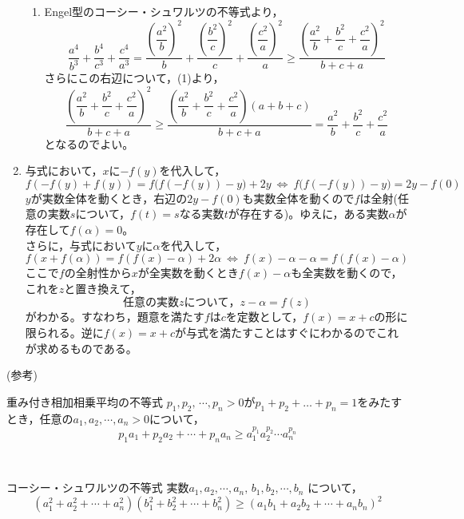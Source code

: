 \documentclass[a4paper,12pt]{jsarticle}
\begin{document}
\begin{enumerate}
\begin{enumerate}
  \item 
  Engel型のコーシー・シュワルツの不等式より，
    $$ \frac{a^{4}}{b^{3}} + \frac{b^{4}}{c^{3}} + \frac{c^{4}}{a^{3}} = \frac{\left(\dfrac{a^{2}}{b}\right)^{2}}{b} + \frac{\left(\dfrac{b^{2}}{c}\right)^{2}}{c} + \frac{\left(\dfrac{c^{2}}{a}\right)^{2}}{a} \geq \frac{\left(\dfrac{a^{2}}{b} + \dfrac{b^{2}}{c} + \dfrac{c^{2}}{a}\right)^{2}}{b+c+a} $$
  さらにこの右辺について，(1)より，
    $$ \frac{\left(\dfrac{a^{2}}{b} + \dfrac{b^{2}}{c} + \dfrac{c^{2}}{a}\right)^{2}}{b+c+a} \geq \frac{\left(\dfrac{a^{2}}{b} + \dfrac{b^{2}}{c} + \dfrac{c^{2}}{a}\right)(a+b+c)}{b+c+a} = \dfrac{a^{2}}{b} + \dfrac{b^{2}}{c} + \dfrac{c^{2}}{a} $$
  となるのでよい。
  \end{enumerate}

\item 
与式において，$x$に$-f(y)$を代入して，
$$ f(-f(y)+f(y)) = f\bigl(f(-f(y))-y\bigr) + 2y \ \Leftrightarrow \ f\bigl(f(-f(y))-y\bigr) = 2y - f(0)$$
$y$が実数全体を動くとき，右辺の$2y-f(0)$も実数全体を動くので$f$は全射(任意の実数$s$について，$f(t)=s$なる実数$t$が存在する)。ゆえに，ある実数$\alpha$が存在して$f(\alpha)=0$。\\
さらに，与式において$y$に$\alpha$を代入して，
  $$ f(x+f(\alpha)) = f(f(x)-\alpha) + 2\alpha \ \Leftrightarrow \ f(x) - \alpha - \alpha= f(f(x)-\alpha)$$
ここで$f$の全射性から$x$が全実数を動くとき$f(x)-\alpha$も全実数を動くので，これを$z$と置き換えて，
$$ 任意の実数zについて，z - \alpha = f(z)$$
がわかる。すなわち，題意を満たす$f$は$c$を定数として，$f(x)=x+c$の形に限られる。逆に$f(x)=x+c$が与式を満たすことはすぐにわかるのでこれが求めるものである。
\end{enumerate}
\vfil






(参考)
\begin{itembox}[l]{重み付き相加相乗平均の不等式}
$p_{1},p_{2},\,\cdots ,p_{n} > 0 $が$p_{1}+p_{2}+\dots + p_{n} =1$をみたすとき，任意の$a_{1},a_{2},\cdots ,a_{n} > 0 $について，
\begin{equation}
p_{1}a_{1} + p_{2}a_{2} + \cdots + p_{n}a_{n} \geq a_{1}^{p_{1}}  a_{2}^{p_{2}}  \cdots a_{n}^{p_{n}} \nonumber
\end{equation}
\end{itembox}\\

\begin{itembox}[l]{コーシー・シュワルツの不等式}
実数$a_{1},a_{2},\cdots ,a_{n} , \,b_{1},b_{2},\cdots ,b_{n}$ について，
\begin{equation}
 (a_{1}^{2} + a_{2}^{2} + \cdots + a_{n}^{2})(b_{1}^{2} + b_{2}^{2} + \cdots + b_{n}^{2}) \geq (a_{1}b_{1} + a_{2}b_{2} + \cdots + a_{n}b_{n})^{2}  \nonumber
\end{equation}
\end{itembox}\\
\end{document}
